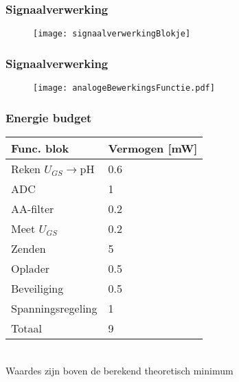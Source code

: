 \begin{frame}
    \frametitle{Signaalverwerking}
    
    \begin{figure}
        \centering
        \texttt{[image: signaalverwerkingBlokje]}
    \end{figure}

\end{frame}

\begin{frame}
    \frametitle{Signaalverwerking}
    
    \begin{figure}
        \centering
        \texttt{[image: analogeBewerkingsFunctie.pdf]}
    \end{figure}

\end{frame}

\begin{frame}
    \frametitle{Energie budget}
    \begin{table}[ht]
        \centering
        \begin{tabular}{l|l}
            Func. blok          & Vermogen [mW] \\
            \hline                              
            Reken $U_{GS}\rightarrow$pH & 0.6   \\
            ADC                 & 1             \\
            AA-filter           & 0.2           \\
            Meet $U_{GS}$       & 0.2           \\
            Zenden              & 5             \\
            Oplader             & 0.5           \\
            Beveiliging         & 0.5           \\
            Spanningsregeling   & 1             \\ 
            \hline
            \hline
            Totaal              & 9
            
        \end{tabular}
        \label{tab:energieBudgetEstimatie}
    \end{table}\\
    Waardes zijn boven de berekend theoretisch minimum
\end{frame}